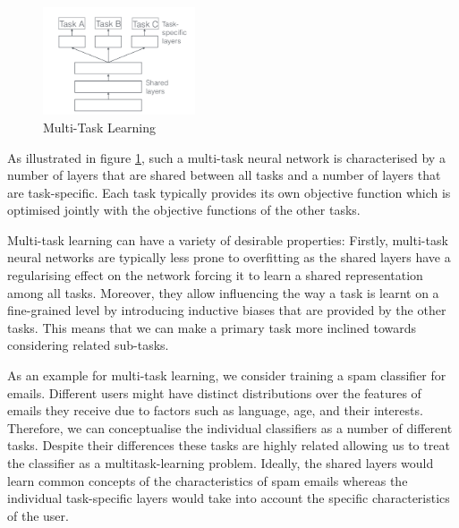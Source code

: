 \begin{figure}
	\caption{Multi-Task Learning}\label{fig:multitask-learning}   
	\centering
	\includegraphics[width=0.4\textwidth]{figures/chapter-2/multitask-learning.png}
\end{figure}
As illustrated in figure \ref{fig:multitask-learning}, such a multi-task neural network is characterised by a number of layers that are shared between all tasks and a number of layers that are task-specific. Each task typically provides its own objective function which is optimised jointly with the objective functions of the other tasks. 

Multi-task learning can have a variety of desirable properties: Firstly, multi-task neural networks are typically less prone to overfitting as the shared layers have a regularising effect on the network forcing it to learn a shared representation among all tasks. Moreover, they allow influencing the way a task is learnt on a fine-grained level by introducing inductive biases \cite{inductive-bias} that are provided by the other tasks. This means that we can make a primary task more inclined towards considering related sub-tasks. 

As an example for multi-task learning, we consider training a spam classifier for emails. Different users might have distinct distributions over the features of emails they receive due to factors such as language, age, and their interests. Therefore, we can conceptualise the individual classifiers as a number of different tasks. Despite their differences these tasks are highly related allowing us to treat the classifier as a multitask-learning problem. Ideally, the shared layers would learn common concepts of the characteristics of spam emails whereas the individual task-specific layers would take into account the specific characteristics of the user. 







